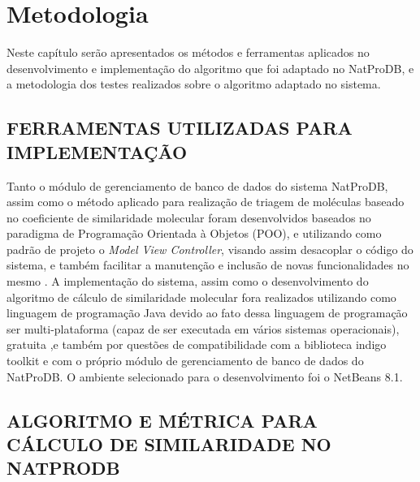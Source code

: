
\chapter{Metodologia}
\label{chap:metodo}
Neste capítulo serão apresentados os métodos e ferramentas aplicados no
desenvolvimento e implementação do algoritmo que foi adaptado no NatProDB, e a metodologia dos testes realizados sobre o algoritmo adaptado no sistema.

\section{FERRAMENTAS UTILIZADAS PARA IMPLEMENTAÇÃO}

Tanto o módulo de gerenciamento de banco de dados do sistema NatProDB, assim como o método aplicado para  realização de triagem de moléculas baseado no coeficiente de similaridade molecular foram desenvolvidos baseados no paradigma de Programação Orientada à Objetos (POO), e utilizando como padrão de projeto o \textit{Model View Controller}, visando assim desacoplar o código do sistema, e também facilitar a manutenção e inclusão de novas funcionalidades no mesmo \cite{patterns2003model}. A implementação do sistema, assim como o desenvolvimento do algoritmo de cálculo de similaridade molecular fora realizados utilizando como linguagem de programação Java devido ao fato dessa linguagem de programação ser multi-plataforma (capaz de ser executada em vários sistemas operacionais),  gratuita ,e também por questões de compatibilidade com a biblioteca indigo toolkit e com o próprio módulo de gerenciamento de banco de dados do NatProDB. O ambiente selecionado para o desenvolvimento foi o NetBeans 8.1.

\section{ALGORITMO E MÉTRICA PARA CÁLCULO DE SIMILARIDADE NO NATPRODB}

